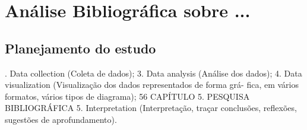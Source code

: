 \chapter{Análise Bibliográfica sobre ...\label{chap:bibliometria:MoustacheGolem}}

\section{Planejamento do estudo}
. Data collection (Coleta de dados);
3. Data analysis (Análise dos dados);
4. Data visualization (Visualização dos dados representados de forma grá-
fica, em vários formatos, vários tipos de diagrama);
56 CAPÍTULO 5. PESQUISA BIBLIOGRÁFICA
5. Interpretation (Interpretação, traçar conclusões, reflexões, sugestões de
aprofundamento).